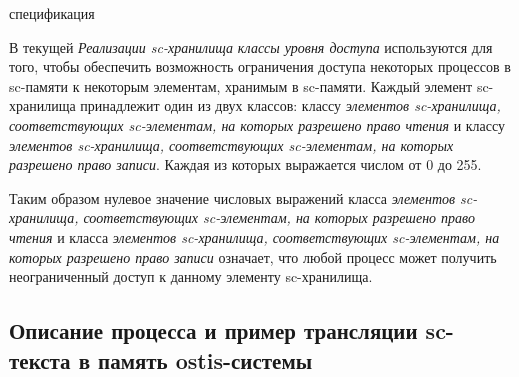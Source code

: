 \begin{SCn}
\begin{scnrelfromset}{спецификация}
\end{scnrelfromset}
\end{SCn}

В текущей \textit{Реализации sc-хранилища} \textit{классы уровня доступа} используются для того, чтобы обеспечить возможность ограничения доступа некоторых процессов в sc-памяти к некоторым элементам, хранимым в sc-памяти. Каждый элемент sc-хранилища принадлежит один из двух классов: классу \textit{элементов sc-хранилища, соответствующих sc-элементам, на которых разрешено право чтения} и классу \textit{элементов sc-хранилища, соответствующих sc-элементам, на которых разрешено право записи}. Каждая из которых выражается числом от 0 до 255.

Таким образом нулевое значение числовых выражений класса \textit{элементов sc-хранилища, соответствующих sc-элементам, на которых разрешено право чтения} и класса \textit{элементов sc-хранилища, соответствующих sc-элементам, на которых разрешено право записи} означает, что любой процесс может получить неограниченный доступ к данному элементу sc-хранилища.

\subsection{Описание процесса и пример трансляции sc-текста в память ostis-системы}
\label{sec_soft_platform_scin_code_example}

